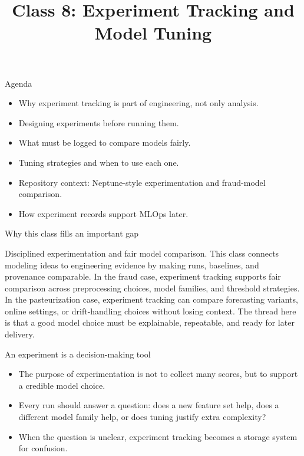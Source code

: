 

\title{Class 8: Experiment Tracking and Model Tuning}
\author{\coursename}
\date{}



\frame{\titlepage \coursefooter}

\begin{frame}{Agenda}
\begin{itemize}
\item Why experiment tracking is part of engineering, not only analysis.
\item Designing experiments before running them.
\item What must be logged to compare models fairly.
\item Tuning strategies and when to use each one.
\item Repository context: Neptune-style experimentation and fraud-model comparison.
\item How experiment records support MLOps later.
\end{itemize}
\coursefooter
\end{frame}

\begin{frame}{Why this class fills an important gap}
\coursefooter
\end{frame}

\coursecontextframe
{Disciplined experimentation and fair model comparison.}
{This class connects modeling ideas to engineering evidence by making runs, baselines, and provenance comparable.}
{In the fraud case, experiment tracking supports fair comparison across preprocessing choices, model families, and threshold strategies.}
{In the pasteurization case, experiment tracking can compare forecasting variants, online settings, or drift-handling choices without losing context.}
{The thread here is that a good model choice must be explainable, repeatable, and ready for later delivery.}

\begin{frame}{An experiment is a decision-making tool}
\begin{itemize}
\item The purpose of experimentation is not to collect many scores, but to support a credible model choice.
\item Every run should answer a question: does a new feature set help, does a different model family help, or does tuning justify extra complexity?
\item When the question is unclear, experiment tracking becomes a storage system for confusion.
\end{itemize}
\coursefooter
\end{frame}

